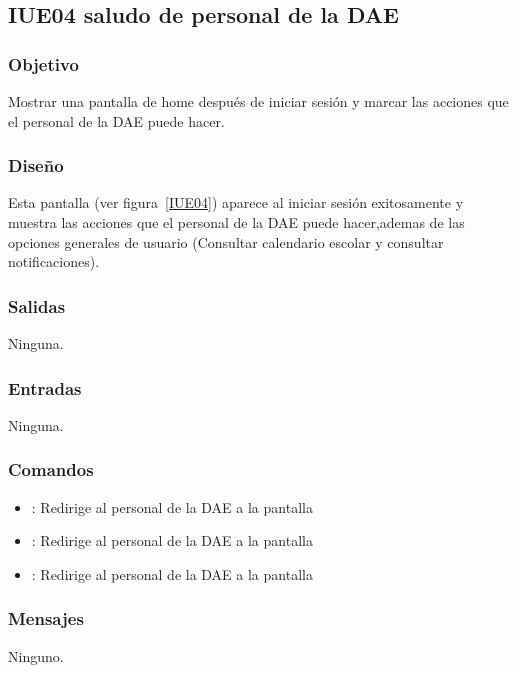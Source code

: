 \subsection{IUE04 saludo de personal de la DAE}

\subsubsection{Objetivo}
Mostrar una pantalla de home después de iniciar sesión y marcar las acciones que el personal de la DAE puede hacer.

\subsubsection{Diseño}
Esta pantalla  (ver figura~\ref{IUE04}) aparece al iniciar sesión exitosamente y muestra las acciones que el personal de la DAE puede hacer,ademas de las opciones generales de usuario (Consultar calendario escolar y consultar notificaciones). 


\subsubsection{Salidas}

Ninguna.

\subsubsection{Entradas}
Ninguna.

\subsubsection{Comandos}
\begin{itemize}
	\item {}: Redirige al personal de la DAE a la pantalla 
	\item {}: Redirige al personal de la DAE a la pantalla 
	\item {}: Redirige al personal de la DAE a la pantalla 
	
\end{itemize}

\subsubsection{Mensajes}

\begin{Citemize}
	\item Ninguno.
\end{Citemize}

